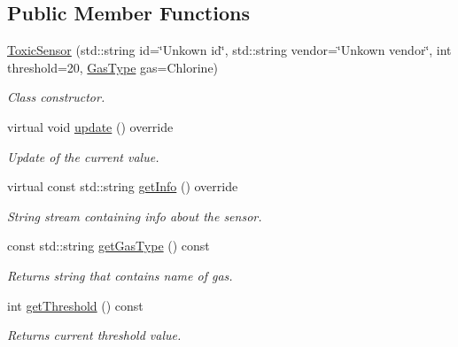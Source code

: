 \subsection*{Public Member Functions}
\begin{DoxyCompactItemize}
\item 
\hyperlink{classToxicSensor_aabe777cf52fe32db29db6596b8e3a7f7}{Toxic\+Sensor} (std\+::string id=\char`\"{}Unkown id\char`\"{}, std\+::string vendor=\char`\"{}Unkown vendor\char`\"{}, int threshold=20, \hyperlink{classToxicSensor_a140f14965ad9a7e71fc8a5a2ed2c919b}{Gas\+Type} gas=Chlorine)
\begin{DoxyCompactList}\small\item\em Class constructor. \end{DoxyCompactList}\item 
virtual void \hyperlink{classToxicSensor_ae4c58761cf2ef02e1d782f7f13cc56ff}{update} () override
\begin{DoxyCompactList}\small\item\em Update of the current value. \end{DoxyCompactList}\item 
virtual const std\+::string \hyperlink{classToxicSensor_abd9e11dc07b3456915ca261dc61071ac}{get\+Info} () override\hypertarget{classToxicSensor_abd9e11dc07b3456915ca261dc61071ac}{}\label{classToxicSensor_abd9e11dc07b3456915ca261dc61071ac}

\begin{DoxyCompactList}\small\item\em String stream containing info about the sensor. \end{DoxyCompactList}\item 
const std\+::string \hyperlink{classToxicSensor_a1f49ce67d6f7d871249b7d817940f6b8}{get\+Gas\+Type} () const \hypertarget{classToxicSensor_a1f49ce67d6f7d871249b7d817940f6b8}{}\label{classToxicSensor_a1f49ce67d6f7d871249b7d817940f6b8}

\begin{DoxyCompactList}\small\item\em Returns string that contains name of gas. \end{DoxyCompactList}\item 
int \hyperlink{classToxicSensor_a4a0ec4b0440b8c8b3cdbb703277cf87c}{get\+Threshold} () const \hypertarget{classToxicSensor_a4a0ec4b0440b8c8b3cdbb703277cf87c}{}\label{classToxicSensor_a4a0ec4b0440b8c8b3cdbb703277cf87c}

\begin{DoxyCompactList}\small\item\em Returns current threshold value. \end{DoxyCompactList}\end{DoxyCompactItemize}
